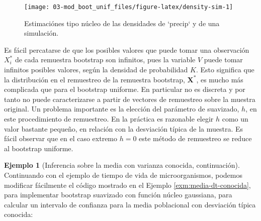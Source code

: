 \documentclass[
]{book}
\theoremstyle{break}
\theoremstyle{definition}
\theoremstyle{definition}
\newtheorem{example}{Ejemplo}[chapter]
\theoremstyle{definition}
\theoremstyle{remark}
\begin{document}
\begin{figure}[!htb]

{\centering \texttt{[image: 03-mod\_boot\_unif\_files/figure-latex/density-sim-1]} 

}

\caption{Estimaciónes tipo núcleo de las densidades de `precip` y de una simulación.}\label{fig:density-sim}
\end{figure}

Es fácil percatarse de que los posibles valores que puede tomar una
observación \(X_i^{\ast}\) de cada remuestra bootstrap son infinitos,
pues la variable \(V\) puede tomar infinitos posibles valores, según la
densidad de probabilidad \(K\). Esto significa que la distribución en el
remuestreo de la remuestra bootstrap, \(\mathbf{X}^{\ast}\), es
mucho más complicada que para el bootstrap uniforme. En particular no es
discreta y por tanto no puede caracterizarse a partir de vectores de
remuestreo sobre la muestra original. Un problema importante es la
elección del parámetro de suavizado, \(h\), en este procedimiento de
remuestreo. En la práctica es razonable elegir \(h\) como un valor
bastante pequeño, en relación con la desviación típica de la muestra. Es
fácil observar que en el caso extremo \(h=0\) este método de remuestreo se
reduce al bootstrap uniforme.

\begin{example}[Inferencia sobre la media con varianza conocida, continuación]
\protect\hypertarget{exm:media-dt-conocida-suav}{}{\label{exm:media-dt-conocida-suav} \iffalse (Inferencia sobre la media con varianza conocida, continuación) \fi{} }
Continuando con el ejemplo de tiempo de vida de microorganismos,
podemos modificar fácilmente el código mostrado en el Ejemplo \ref{exm:media-dt-conocida}, para implementar bootstrap suavizado
con función núcleo gaussiana, para calcular un intervalo de confianza
para la media poblacional con desviación típica conocida:
\end{example}
\end{document}

